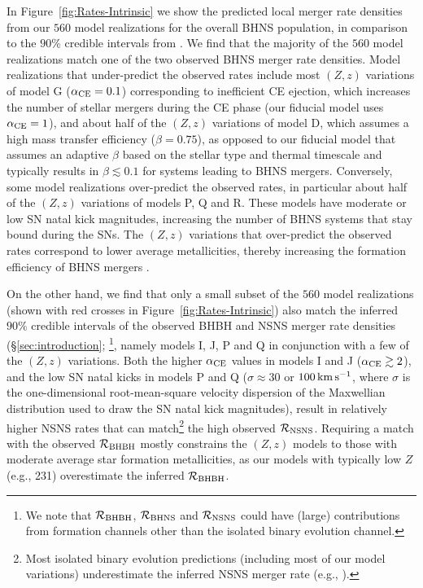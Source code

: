 \documentclass{aastex63}
\newcommand{\Zi}{\ensuremath{Z}\xspace}
\newcommand{\kms}{\ensuremath{\,\rm{km}\,\rm{s}^{-1}}\xspace}
\newcommand{\SFRD}{\text{SFRD}\ensuremath{(Z,z)}\xspace}
\newcommand{\Rbhns}{\ensuremath{\mathcal{R}_{\rm{BHNS}}}\xspace}
\newcommand{\Rbhbh}{\ensuremath{\mathcal{R}_{\rm{BHBH}}}\xspace}
\newcommand{\Rnsns}{\ensuremath{\mathcal{R}_{\rm{NSNS}}}\xspace}
\newcommand{\Nmodels}{\ensuremath{560}\xspace}
\begin{document}
In Figure~\ref{fig:Rates-Intrinsic} we show the predicted local merger rate densities from our \Nmodels model realizations for the overall \ac{BHNS} population, in comparison to the $90\%$ credible intervals from  \citet{Abbott:2021-first-NSBH}. We find that the majority of the \Nmodels model realizations match one of the two observed \ac{BHNS} merger rate densities. Model realizations that under-predict the observed rates include most \SFRD variations of model G ($\alpha_{\rm{CE}}=0.1$) corresponding to inefficient \ac{CE} ejection, which increases the number of stellar mergers during the \ac{CE} phase (our fiducial model uses $\alpha_{\rm{CE}}=1$), and about half of the \SFRD variations of model D, which assumes a high mass transfer efficiency ($\beta = 0.75$), as opposed to our fiducial model that assumes an adaptive $\beta$ based on the stellar type and thermal timescale and typically results in $\beta\lesssim 0.1$ for systems leading to \ac{BHNS} mergers.  Conversely, some model realizations over-predict the observed rates, in particular about half of the \SFRD variations of models P, Q and R.  These models have moderate or low \ac{SN} natal kick magnitudes, increasing the number of \ac{BHNS} systems that stay bound during the \acp{SN}. The \SFRD variations that over-predict the observed rates correspond to lower average metallicities, thereby increasing the formation efficiency of \ac{BHNS} mergers \citep{Broekgaarden:2021}.


On the other hand, we find that only a small subset of the \Nmodels model realizations (shown with red crosses in Figure~\ref{fig:Rates-Intrinsic})  also match the inferred $90\%$ credible intervals of the observed \ac{BHBH} and \ac{NSNS} merger rate densities (\S\ref{sec:introduction}; \citealt{BroekgaardenDCOmergers:2021}\footnote{We note that \Rbhbh, \Rbhns and \Rnsns could have (large) contributions from formation channels other than the isolated binary evolution channel.},
namely models I, J,  P and Q in conjunction with a few of the \SFRD variations. Both the higher $\alpha_{\rm{CE}}$ values in models I and J ($\alpha_{\rm{CE}}\gtrsim 2$), and the low \ac{SN} natal kicks in models P and Q ($\sigma\approx 30$ or $100\kms$, where $\sigma$ is the one-dimensional root-mean-square velocity dispersion of the Maxwellian distribution used to draw the \ac{SN} natal kick magnitudes), result in relatively higher \ac{NSNS} rates that can match\footnote{Most isolated binary evolution predictions (including most of our model variations) underestimate the inferred \ac{NSNS} merger rate (e.g., \citealt{Chruslinska:2018,MandelBroekgaardenReview:2021}).} the high observed \Rnsns.  Requiring a match with the observed \Rbhbh mostly constrains the \SFRD models to those with moderate average star formation metallicities, as our models with typically low \Zi (e.g., 231) overestimate the inferred \Rbhbh \citep{BroekgaardenDCOmergers:2021}.
\end{document}
